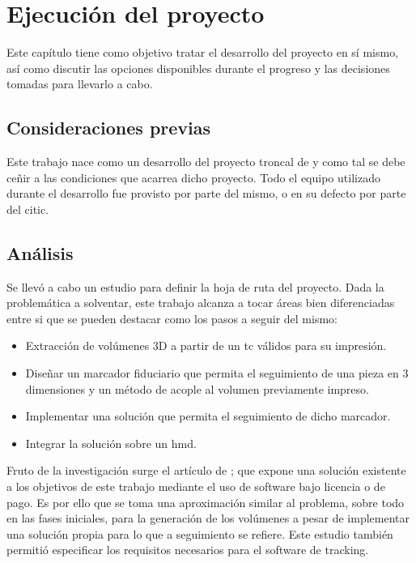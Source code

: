 \chapter{Ejecución del proyecto}
\label{chap:edp}
Este capítulo tiene como objetivo tratar el desarrollo del proyecto en sí mismo, así como discutir las opciones disponibles durante el progreso y las decisiones tomadas para llevarlo a cabo.

\section{Consideraciones previas}
Este trabajo nace como un desarrollo del proyecto troncal de \citeauthor{IglesiasGuitian2022} y como tal se debe ceñir a las condiciones que acarrea dicho proyecto. Todo el equipo utilizado durante el desarrollo fue provisto por parte del mismo, o en su defecto por parte del \acrfull{citic}.

\section{Análisis}
Se llevó a cabo un estudio para definir la hoja de ruta del proyecto. Dada la problemática a solventar, este trabajo alcanza a tocar áreas bien diferenciadas entre si que se pueden destacar como los pasos a seguir del mismo:
\begin{itemize}
	\item Extracción de volúmenes 3D a partir de un \acrshort{tc} válidos para su impresión.
	\item Diseñar un marcador fiduciario que permita el seguimiento de una pieza en 3 dimensiones y un método de acople al volumen previamente impreso.
	\item Implementar una solución que permita el seguimiento de dicho marcador.
	\item Integrar la solución sobre un \acrshort{hmd}.
\end{itemize}

Fruto de la investigación surge el artículo de  \citeauthor{MoretaMartinez2020}; que expone una solución existente a los objetivos de este trabajo mediante el uso de software bajo licencia o de pago.  Es por ello que se toma una aproximación similar al problema, sobre todo en las fases iniciales, para la generación de los volúmenes a pesar de implementar una solución propia para lo que a seguimiento se refiere. Este estudio también permitió especificar los requisitos necesarios para el software de tracking.

